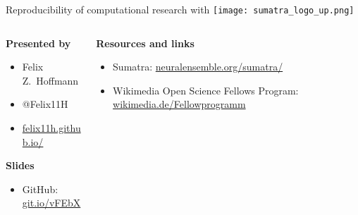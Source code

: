 \begin{frame}
  \begin{center} 
    \large Reproducibility of computational research with
    \texttt{[image: sumatra\_logo\_up.png]}
  \end{center}
  
  \vspace{0.4cm}

  \small
  \begin{columns}[t]
    \begin{column}{0.4\textwidth}        
      \textbf{Presented by}
      
      \begin{itemize}[leftmargin=0.6cm]
        \itemsep0pt
      \item[] Felix Z.~Hoffmann
        \item[] @Felix11H
        \item[] \href{http://felix11h.github.io/}{felix11h.github.io/}
      \end{itemize}

      \vspace{0.38cm}
      \textbf{Slides}
      
      \begin{itemize}[leftmargin=0.6cm]
        \item[] GitHub:\\ %
          \href{https://github.com/Felix11H/GSoC14_munich_slides}{git.io/vFEbX}
      \end{itemize}
    \end{column}
    \begin{column}{0.59\textwidth}
      \textbf{Resources and links}
      \vspace{-0.1cm}
       
      \begin{itemize}[leftmargin=0.6cm]
        \itemsep4pt
        \item[] Sumatra: %
          \href{http://neuralensemble.org/sumatra/}{%
            neuralensemble.org/sumatra/}\\
        \item[] Wikimedia Open Science Fellows Program: %
          \href{https://wikimedia.de/wiki/BildungWissenschaftKultur/Fellowprogramm}{%
            wikimedia.de/Fellowprogramm}
      \end{itemize}


\end{column}
\end{columns}
\end{frame}
